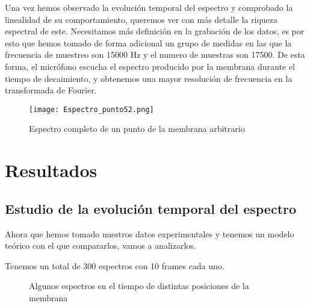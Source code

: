\documentclass[journal, a4paper,onecolumn]{IEEEtran}
\begin{document}
Una vez hemos observado la evolución temporal del espectro y comprobado la linealidad de su comportamiento, queremos ver con más detalle la riqueza espectral de este. Necesitamos más definición en la grabación de los datos, es por esto que hemos tomado de forma adicional un grupo de medidas en las que la frecuencia de muestreo son 15000 Hz y el numero de muestras son 17500. De esta forma, el micrófono escucha el espectro producido por la membrana durante el tiempo de decaimiento, y obtenemos una mayor resolución de frecuencia en la transformada de Fourier.\newline

\begin{figure}[H]
    \centering
    \texttt{[image: Espectro\_punto52.png]}
    \caption{Espectro completo de un punto de la membrana arbitrario}

\end{figure}



\section{Resultados}

\subsection{Estudio de la evolución temporal del espectro}

Ahora que hemos tomado nuestros datos experimentales y tenemos un modelo teórico con el que compararlos, vamos a analizarlos.\newline

Tenemos un total de 300 espectros con 10 frames cada uno. 

\begin{figure}[H]%
\centering

    \quad
    \quad
    \quad
    \quad
   
    \end{figure} 
    
    \begin{figure}[H]%
    \quad
    \quad
    \centering
    \quad
    \quad
    \caption{Algunos espectros en el tiempo de distintas posiciones de la membrana}
    \end{figure}
   
\end{document}
